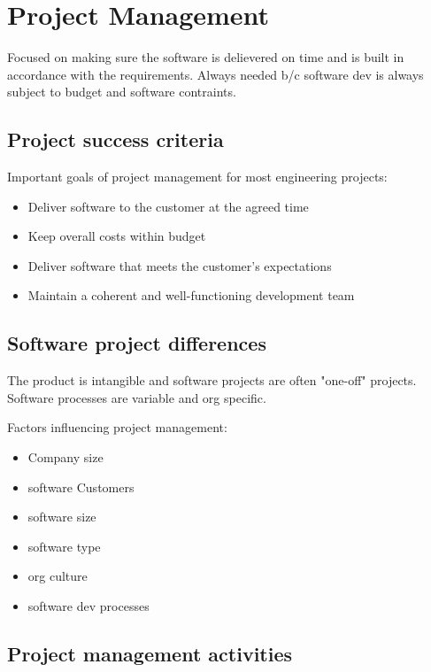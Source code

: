 \documentclass{article}
\begin{document}
    \section*{Project Management}

    Focused on making sure the software is delievered on time and is built in accordance 
    with the requirements. Always needed b/c software dev is always subject to budget and 
    software contraints.

    \subsection*{Project success criteria}

    Important goals of project management for most engineering projects:
    \begin{itemize}
        \item Deliver software to the customer at the agreed time
        \item Keep overall costs within budget
        \item Deliver software that meets the customer’s expectations
        \item Maintain a coherent and well-functioning development team
    \end{itemize}

    \subsection*{Software project differences}

    The product is intangible and software projects are often "one-off" projects. Software 
    processes are variable and org specific.

    Factors influencing project management:
    \begin{itemize}
        \item Company size
        \item software Customers
        \item software size
        \item software type
        \item org culture 
        \item software dev processes
    \end{itemize}

    \subsection*{Project management activities}
\end{document}
